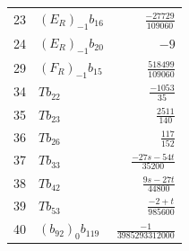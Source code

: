 \begin{longtable}{@{}rlr@{}}
23 & $(E_R)_{-1}b_{16}$ & $\frac{-27729}{109060}$\\
24 & $(E_R)_{-1}b_{20}$ & $-9$\\
29 & $(F_R)_{-1}b_{15}$ & $\frac{518499}{109060}$\\
34 & $Tb_{22}$ & $\frac{-1053}{35}$\\
35 & $Tb_{23}$ & $\frac{2511}{140}$\\
36 & $Tb_{26}$ & $\frac{117}{152}$\\
37 & $Tb_{33}$ & $\frac{-27s-54t}{35200}$\\
38 & $Tb_{42}$ & $\frac{9s-27t}{44800}$\\
39 & $Tb_{53}$ & $\frac{-2+t}{985600}$\\
40 & $(b_{92})_0b_{119}$ & $\frac{-1}{3985293312000}$\\
\end{longtable}
\endgroup
